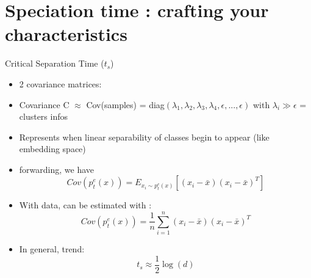 \documentclass[aspectratio=169]{beamer}
\begin{document}











\section{Speciation time : crafting your characteristics}

\begin{frame}{Critical Separation Time ($t_s$)}
    \begin{itemize}
    
        \item 2 covariance matrices:
        
        \item Covariance C $\approx$ Cov(samples) = diag$(\lambda_1, \lambda_2, \lambda_3, \lambda_4, \epsilon, ..., \epsilon)$ with $\lambda_i \gg \epsilon$ = clusters infos
        
        \item Represents when linear separability of classes begin to appear (like embedding space)
        
        \item forwarding, we have 
        \begin{equation}
            Cov(p_t^e(x)) = E_{x_i \sim p_t^e(x)} [(x_i - \bar{x})(x_i - \bar{x})^T]
        \end{equation}
        
        \item With data, can be estimated with :
        \begin{equation}
            Cov(p_t^e(x)) = \frac{1}{n} \sum_{i=1}^n (x_i - \bar{x})(x_i - \bar{x})^T
        \end{equation}
        
        \item In general, trend:
        \begin{equation}
            t_s \approx \frac{1}{2}\log(d)
        \end{equation}
    \end{itemize}
\end{frame}
    
\end{document}
